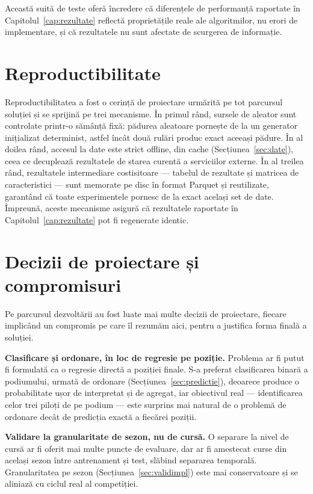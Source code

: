\documentclass[12pt,a4paper]{report}
\begin{document}
Această suită de teste oferă încredere că diferențele de performanță raportate în
Capitolul~\ref{cap:rezultate} reflectă proprietățile reale ale algoritmilor, nu erori de
implementare, și că rezultatele nu sunt afectate de scurgerea de informație.

\section{Reproductibilitate}
\label{sec:reproductibilitate}

Reproductibilitatea a fost o cerință de proiectare urmărită pe tot parcursul soluției și se sprijină
pe trei mecanisme. În primul rând, sursele de aleator sunt controlate printr-o sămânță fixă: pădurea
aleatoare pornește de la un generator inițializat determinist, astfel încât două rulări produc
exact aceeași pădure. În al doilea rând, accesul la date este strict offline, din cache
(Secțiunea~\ref{sec:date}), ceea ce decuplează rezultatele de starea curentă a serviciilor externe.
În al treilea rând, rezultatele intermediare costisitoare --- tabelul de rezultate și matricea de
caracteristici --- sunt memorate pe disc în format Parquet și reutilizate, garantând că toate
experimentele pornesc de la exact același set de date. Împreună, aceste mecanisme asigură că
rezultatele raportate în Capitolul~\ref{cap:rezultate} pot fi regenerate identic.

\section{Decizii de proiectare și compromisuri}
\label{sec:decizii}

Pe parcursul dezvoltării au fost luate mai multe decizii de proiectare, fiecare implicând un
compromis pe care îl rezumăm aici, pentru a justifica forma finală a soluției.

\textbf{Clasificare și ordonare, în loc de regresie pe poziție.} Problema ar fi putut fi formulată
ca o regresie directă a poziției finale. S-a preferat clasificarea binară a podiumului, urmată de
ordonare (Secțiunea~\ref{sec:predictie}), deoarece produce o probabilitate ușor de interpretat și
de agregat, iar obiectivul real --- identificarea celor trei piloți de pe podium --- este surprins
mai natural de o problemă de ordonare decât de predicția exactă a fiecărei poziții.

\textbf{Validare la granularitate de sezon, nu de cursă.} O separare la nivel de cursă ar fi oferit
mai multe puncte de evaluare, dar ar fi amestecat curse din același sezon între antrenament și test,
slăbind separarea temporală. Granularitatea pe sezon (Secțiunea~\ref{sec:validimpl}) este mai
conservatoare și se aliniază cu ciclul real al competiției.
\end{document}
